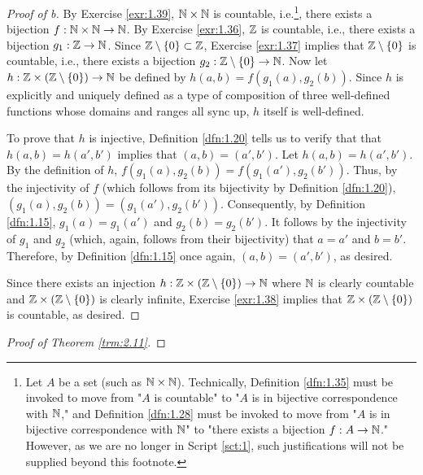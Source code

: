 \documentclass[../main.tex]{subfiles}
\begin{document}
\begin{theorem}
\begin{lemma*}
\begin{proof}[Proof of b]
            By Exercise \ref{exr:1.39}, $\mathbb{N}\times\mathbb{N}$ is countable, i.e.\footnote{Let $A$ be a set (such as $\mathbb{N}\times\mathbb{N}$). Technically, Definition \ref{dfn:1.35} must be invoked to move from "$A$ is countable" to "$A$ is in bijective correspondence with $\mathbb{N}$," and Definition \ref{dfn:1.28} must be invoked to move from "$A$ is in bijective correspondence with $\mathbb{N}$" to "there exists a bijection $f:A\to\mathbb{N}$." However, as we are no longer in Script \ref{sct:1}, such justifications will not be supplied beyond this footnote.}, there exists a bijection $f:\mathbb{N}\times\mathbb{N}\to\mathbb{N}$. By Exercise \ref{exr:1.36}, $\mathbb{Z}$ is countable, i.e., there exists a bijection $g_1:\mathbb{Z}\to\mathbb{N}$. Since $\mathbb{Z}\setminus\{0\}\subset\mathbb{Z}$, Exercise \ref{exr:1.37} implies that $\mathbb{Z}\setminus\{0\}$ is countable, i.e., there exists a bijection $g_2:\mathbb{Z}\setminus\{0\}\to\mathbb{N}$. Now let $h:\mathbb{Z}\times(\mathbb{Z}\setminus\{0\})\to\mathbb{N}$ be defined by $h(a,b)=f(g_1(a),g_2(b))$. Since $h$ is explicitly and uniquely defined as a type of composition of three well-defined functions whose domains and ranges all sync up, $h$ itself is well-defined.\par
            To prove that $h$ is injective, Definition \ref{dfn:1.20} tells us to verify that that $h(a,b)=h(a',b')$ implies that $(a,b)=(a',b')$. Let $h(a,b)=h(a',b')$. By the definition of $h$, $f(g_1(a),g_2(b))=f(g_1(a'),g_2(b'))$. Thus, by the injectivity of $f$ (which follows from its bijectivity by Definition \ref{dfn:1.20}), $(g_1(a),g_2(b))=(g_1(a'),g_2(b'))$. Consequently, by Definition \ref{dfn:1.15}, $g_1(a)=g_1(a')$ and $g_2(b)=g_2(b')$. It follows by the injectivity of $g_1$ and $g_2$ (which, again, follows from their bijectivity) that $a=a'$ and $b=b'$. Therefore, by Definition \ref{dfn:1.15} once again, $(a,b)=(a',b')$, as desired.\par
            Since there exists an injection $h:\mathbb{Z}\times(\mathbb{Z}\setminus\{0\})\to\mathbb{N}$ where $\mathbb{N}$ is clearly countable and $\mathbb{Z}\times(\mathbb{Z}\setminus\{0\})$ is clearly infinite, Exercise \ref{exr:1.38} implies that $\mathbb{Z}\times(\mathbb{Z}\setminus\{0\})$ is countable, as desired.
        \end{proof}
    \end{lemma*}
    \begin{proof}[Proof of Theorem \ref{trm:2.11}]

\end{proof}
\end{theorem}
\end{document}
